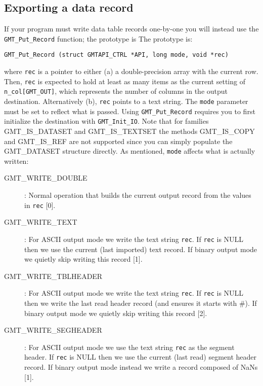 \documentclass{report}
\begin{document}
\subsection{Exporting a data record}

If your program must write data table records one-by-one you will instead use the
\texttt{GMT\_Put\_Record} function; the prototype is
The prototype is:

\begin{verbatim}
GMT_Put_Record (struct GMTAPI_CTRL *API, long mode, void *rec)
\end{verbatim}
where \texttt{rec} is a pointer to either (a) a double-precision array with the current row.
Then, \texttt{rec} is expected to hold at least as many items as the current setting of
\texttt{n\_col[GMT\_OUT]}, which represents the number of columns in the output destination.
Alternatively (b), \texttt{rec} points to a text string.
The \texttt{mode} parameter must be set to reflect what is passed.  Using \texttt{GMT\_Put\_Record}
requires you to first initialize the destination with \texttt{GMT\_Init\_IO}.
Note that for families GMT\_IS\_DATASET and GMT\_IS\_TEXTSET the methods GMT\_IS\_COPY and GMT\_IS\_REF are not supported since
you can simply populate the GMT\_DATASET structure directly.
As mentioned, \texttt{mode} affects what is actually written:
\begin{description}
\item [GMT\_WRITE\_DOUBLE]: Normal operation that builds the current output record from
the values in \texttt{rec} [0].
\item [GMT\_WRITE\_TEXT]: For ASCII output mode we write the text string \texttt{rec}.
If \texttt{rec} is NULL then we use the current (last imported) text record.
If binary output mode we quietly skip writing this record [1].
\item [GMT\_WRITE\_TBLHEADER]: For ASCII output mode we write the text string \texttt{rec}.
If \texttt{rec} is NULL then we write the last read
header record (and ensures it starts with \#). If binary output mode we quietly skip writing this record [2].
\item [GMT\_WRITE\_SEGHEADER]: For ASCII output mode we use the text string \texttt{rec} as the segment header.
If \texttt{rec} is NULL then we use the current (last read) segment header record.
If binary output mode instead we write a record composed of NaNs [1].
\end{description}
\end{document}

